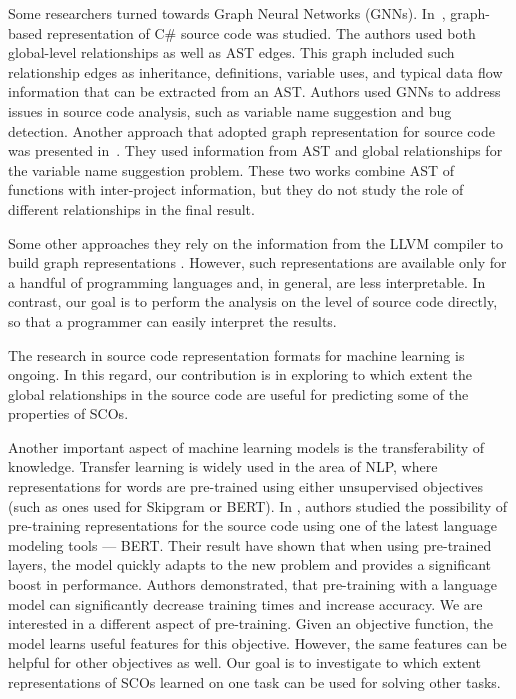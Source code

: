 \documentclass[a4paper,twoside]{article}
\begin{document}
Some researchers turned towards Graph Neural Networks (GNNs). In~\cite{Allamanis2017}, graph-based representation of C\# source code was studied. The authors used both global-level relationships as well as AST edges. This graph included such relationship edges as inheritance, definitions, variable uses, and typical data flow information that can be extracted from an AST\@. Authors used GNNs to address issues in source code analysis, such as variable name suggestion and bug detection. 
Another approach that adopted graph representation for source code was presented in~\cite{Cvitkovic2018}. They used information from AST and global relationships for the variable name suggestion problem. These two works combine AST of functions with inter-project information, but they do not study the role of different relationships in the final result. 

Some other approaches they rely on the information from the LLVM compiler to build graph representations \cite{Ben-Nun2018} \cite{Brauckmann2020}. However, such representations are available only for a handful of programming languages and, in general, are less interpretable. In contrast, our goal is to perform the analysis on the level of source code directly, so that a programmer can easily interpret the results. 

The research in source code representation formats for machine learning is ongoing. In this regard, our contribution is in exploring to which extent the global relationships in the source code are useful for predicting some of the properties of SCOs.

Another important aspect of machine learning models is the transferability of knowledge. Transfer learning is widely used in the area of NLP, where representations for words are pre-trained using either unsupervised objectives (such as ones used for Skipgram or BERT).
In \cite{Kanade2019}, authors studied the possibility of pre-training representations for the source code using one of the latest language modeling tools --- BERT\@. Their result have shown that when using pre-trained layers, the model quickly adapts to the new problem and provides a significant boost in performance. Authors demonstrated, that pre-training with a language model can significantly decrease training times and increase accuracy. We are interested in a different aspect of pre-training. Given an objective function, the model learns useful features for this objective. However, the same features can be helpful for other objectives as well. Our goal is to investigate to which extent representations of SCOs learned on one task can be used for solving other tasks.
\end{document}
